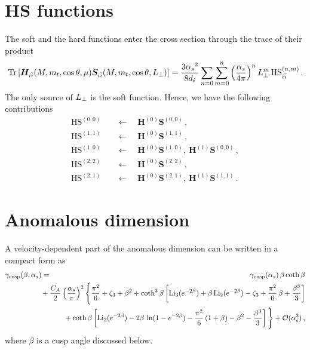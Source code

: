\documentclass[a4paper,11pt]{report}
\numberwithin{equation}{section}
\begin{document}
\section{HS functions}

The soft and the hard functions enter the cross section through the trace of
their product
%
\begin{equation}
  \text{Tr} \left[\mathbold{H}_{\iibar}(M, m_t, \cos\theta, \mu) 
                  \mathbold{S}_{\iibar}(M, m_t, \cos\theta, \LT)\right] = 
  \frac{3\as^2}{8 d_i} \sum_{n=0}  \sum^{n}_{m=0}
  \left(\asp\right)^n \LT^m\,
  \text{HS}^{(n,m)}_\iibar\,.
\end{equation}
%
The only source of $L_\perp$ is the soft function. Hence, we have the following
contributions
%
\begin{align}
  \text{HS}^{(0,0)} & 
  \quad \leftarrow  \quad \mathbold{H}^{(0)} \mathbold{S}^{(0,0)}\,, \\
  \text{HS}^{(1,1)} & 
  \quad \leftarrow  \quad \mathbold{H}^{(0)} \mathbold{S}^{(1,1)}\,, \\
  \text{HS}^{(1,0)} & 
  \quad \leftarrow  \quad \mathbold{H}^{(0)} \mathbold{S}^{(1,0)},\ 
	                  \mathbold{H}^{(1)} \mathbold{S}^{(0,0)}\,, \\
  \text{HS}^{(2,2)} & 
  \quad \leftarrow  \quad \mathbold{H}^{(0)} \mathbold{S}^{(2,2)}\,, \\
  \text{HS}^{(2,1)} & 
  \quad \leftarrow  \quad \mathbold{H}^{(0)} \mathbold{S}^{(2,1)},\ 
	                  \mathbold{H}^{(1)} \mathbold{S}^{(1,1)}\,.
\end{align}


\section{Anomalous dimension}

A velocity-dependent part of the anomalous dimension can be written in a compact
form as~\cite{Ferroglia:2009ii, Kidonakis:2009ev}
%
\begin{eqnarray}
   \label{eq:vel-dep-ad}
   \gamma_{\rm cusp}(\beta,\alpha_s)
   &=& \gamma_{\rm cusp}(\alpha_s)\,\beta\coth\beta \nonumber\\
   &&\hspace{-22mm}\mbox{}+ \frac{C_A}{2} 
    \left( \frac{\alpha_s}{\pi} \right)^2 
    \Bigg\{ \frac{\pi^2}{6} + \zeta_3 + \beta^2 
    + \coth^2\beta \left[ \mbox{Li}_3(e^{-2\beta}) 
    + \beta\,\mbox{Li}_2(e^{-2\beta}) - \zeta_3 
    + \frac{\pi^2}{6}\,\beta + \frac{\beta^3}{3} \right] \\
   &&\quad\mbox{}+ \coth\beta \left[ 
    \mbox{Li}_2(e^{-2\beta}) - 2\beta\,\ln(1-e^{-2\beta}) 
    - \frac{\pi^2}{6}\,(1+\beta) - \beta^2 - \frac{\beta^3}{3} 
    \right] \Bigg\}
    + {\cal O}(\alpha_s^3) \,, \nonumber
\end{eqnarray}
%
where $\beta$ is a cusp angle discussed below.
\end{document}
